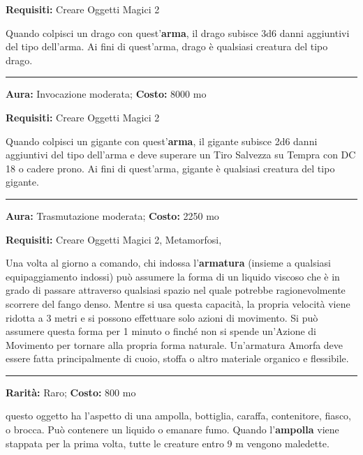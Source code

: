 \begin{multicols}{2}
\textbf{Requisiti:} Creare Oggetti Magici 2

Quando colpisci un drago con quest'\textbf{arma}, il drago subisce 3d6 danni aggiuntivi del tipo dell'arma. Ai fini di quest'arma, drago è qualsiasi creatura del tipo drago.

\smallskip\noindent\rule{\linewidth}{2pt}  \hypertarget{AmmazzaGiganti}{}\medskip{}\noindent\label{AmmazzaGiganti}

\textbf{Aura:} Invocazione moderata; \textbf{Costo:} 8000 mo

\textbf{Requisiti:} Creare Oggetti Magici 2

Quando colpisci un gigante con quest'\textbf{arma}, il gigante subisce 2d6 danni aggiuntivi del tipo dell'arma e deve superare un Tiro Salvezza su Tempra con DC 18 o cadere prono. Ai fini di quest'arma, gigante è qualsiasi creatura del tipo gigante.

\smallskip\noindent\rule{\linewidth}{2pt}  \hypertarget{Amorfa}{}\medskip{}\noindent\label{Amorfa}

\textbf{Aura:} Trasmutazione moderata; \textbf{Costo:} 2250 mo

\textbf{Requisiti:} Creare Oggetti Magici 2, Metamorfosi,

Una volta al giorno a comando, chi indossa l'\textbf{armatura} (insieme a qualsiasi equipaggiamento indossi) può assumere la forma di un liquido viscoso che è in grado di passare attraverso qualsiasi spazio nel quale potrebbe ragionevolmente scorrere del fango denso. Mentre si usa questa capacità, la propria velocità viene ridotta a 3 metri e si possono effettuare solo azioni di movimento. Si può assumere questa forma per 1 minuto o finché non si spende un'Azione di Movimento per tornare alla propria forma naturale. Un'armatura Amorfa deve essere fatta principalmente di cuoio, stoffa o altro materiale organico e flessibile.

\smallskip\noindent\rule{\linewidth}{2pt}  \hypertarget{Ampolladellemaledizioni}{}\medskip{}\noindent\label{Ampolladellemaledizioni}

\textbf{Rarità:} Raro; \textbf{Costo:} 800 mo

questo oggetto ha l'aspetto di una ampolla, bottiglia, caraffa, contenitore, fiasco, o brocca. Può contenere un liquido o emanare fumo. Quando l'\textbf{ampolla} viene stappata per la prima volta, tutte le creature entro 9 m vengono maledette.


\end{multicols}
